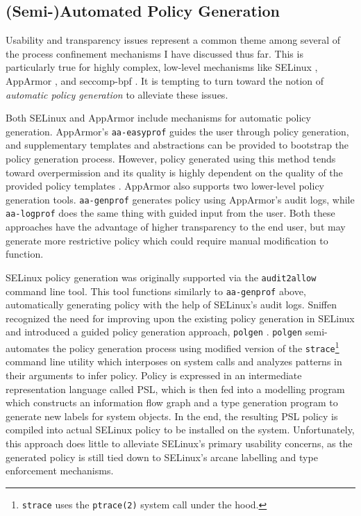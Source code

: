\documentclass[dvipsnames, 12pt]{article}
\begin{document}
\subsection{(Semi-)Automated Policy Generation}

Usability and transparency issues represent a common theme among several of the
process confinement mechanisms I have discussed thus far. This is particularly
true for highly complex, low-level mechanisms like SELinux
\cite{smalley2001_selinux}, AppArmor \cite{cowan2000_apparmor}, and seccomp-bpf
\cite{drewry2012_seccomp_bpf,seccomp_bpf}. It is tempting to turn toward the
notion of \textit{automatic policy generation} to alleviate these issues.

Both SELinux and AppArmor include mechanisms for automatic policy generation.
AppArmor's \texttt{aa-easyprof} \cite{aa_easyprof} guides the user through
policy generation, and supplementary templates and abstractions can be provided
to bootstrap the policy generation process. However, policy generated using this
method tends toward overpermission and its quality is highly dependent on the
quality of the provided policy templates \cite{aa_easyprof}.  AppArmor also
supports two lower-level policy generation tools.  \texttt{aa-genprof}
\cite{aa_genprof} generates policy using AppArmor's audit logs, while
\texttt{aa-logprof} \cite{aa_logprof} does the same thing with guided input from
the user. Both these approaches have the advantage of higher transparency to the
end user, but may generate more restrictive policy which could require manual
modification to function.

SELinux policy generation was originally supported via the \texttt{audit2allow}
\cite{audit2allow} command line tool. This tool functions similarly to
\texttt{aa-genprof} \cite{aa_genprof} above, automatically generating policy
with the help of SELinux's audit logs. Sniffen \etal recognized the need for
improving upon the existing policy generation in SELinux and introduced a guided
policy generation approach, \texttt{polgen} \cite{sniffen06_guided}.
\texttt{polgen} semi-automates the policy generation process using modified
version of the \texttt{strace}\footnote{\texttt{strace} uses the
\texttt{ptrace(2)} system call under the hood.} command line utility which
interposes on system calls and analyzes patterns in their arguments to infer
policy. Policy is expressed in an intermediate representation language called
PSL, which is then fed into a modelling program which constructs an information
flow graph and a type generation program to generate new labels for system
objects. In the end, the resulting PSL policy is compiled into actual SELinux
policy to be installed on the system. Unfortunately, this approach does little
to alleviate SELinux's primary usability concerns, as the generated policy is
still tied down to SELinux's arcane labelling and type enforcement mechanisms.
\end{document}
